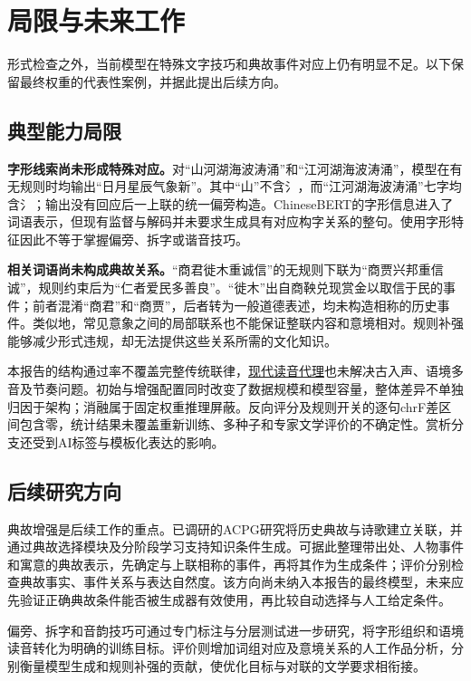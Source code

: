 \section{局限与未来工作}\label{sec:limitations}

形式检查之外，当前模型在特殊文字技巧和典故事件对应上仍有明显不足。以下保留最终权重的代表性案例，并据此提出后续方向。

\subsection{典型能力局限}

\textbf{字形线索尚未形成特殊对应。}对“山河湖海波涛涌”和“江河湖海波涛涌”，模型在有无规则时均输出“日月星辰气象新”。其中“山”不含氵，而“江河湖海波涛涌”七字均含氵；输出没有回应后一上联的统一偏旁构造。ChineseBERT的字形信息进入了词语表示，但现有监督与解码并未要求生成具有对应构字关系的整句。使用字形特征因此不等于掌握偏旁、拆字或谐音技巧。

\textbf{相关词语尚未构成典故关系。}“商君徙木重诚信”的无规则下联为“商贾兴邦重信诚”，规则约束后为“仁者爱民多善良”。“徙木”出自商鞅兑现赏金以取信于民的事件\cite{shiji}；前者混淆“商君”和“商贾”，后者转为一般道德表述，均未构造相称的历史事件。类似地，常见意象之间的局部联系也不能保证整联内容和意境相对。规则补强能够减少形式违规，却无法提供这些关系所需的文化知识。

本报告的结构通过率不覆盖完整传统联律，\href{https://github.com/mozillazg/python-pinyin}{现代读音代理}也未解决古入声、语境多音及节奏问题。初始与增强配置同时改变了数据规模和模型容量，整体差异不单独归因于架构；消融属于固定权重推理屏蔽。反向评分及规则开关的逐句chrF差区间包含零，统计结果未覆盖重新训练、多种子和专家文学评价的不确定性。赏析分支还受到AI标签与模板化表达的影响。

\subsection{后续研究方向}

典故增强是后续工作的重点。已调研的ACPG研究将历史典故与诗歌建立关联，并通过典故选择模块及分阶段学习支持知识条件生成\cite{acpg}。可据此整理带出处、人物事件和寓意的典故表示，先确定与上联相称的事件，再将其作为生成条件；评价分别检查典故事实、事件关系与表达自然度。该方向尚未纳入本报告的最终模型，未来应先验证正确典故条件能否被生成器有效使用，再比较自动选择与人工给定条件。

偏旁、拆字和音韵技巧可通过专门标注与分层测试进一步研究，将字形组织和语境读音转化为明确的训练目标。评价则增加词组对应及意境关系的人工作品分析，分别衡量模型生成和规则补强的贡献，使优化目标与对联的文学要求相衔接。
